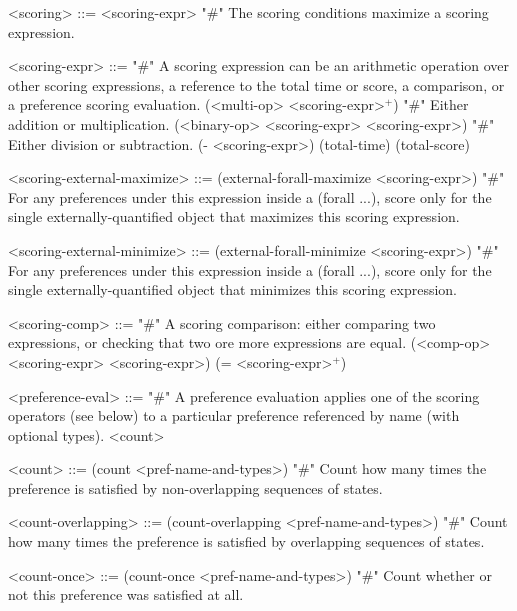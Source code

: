 \documentclass{article}
\begin{document}
\begin{grammar}
<scoring> ::= <scoring-expr> "#" The scoring conditions maximize a scoring expression.

<scoring-expr> ::= "#" A scoring expression can be an arithmetic operation over other scoring expressions, a reference to the total time or score, a comparison, or a preference scoring evaluation.
        \alt (<multi-op> <scoring-expr>$^+$) "#" Either addition or multiplication.
        \alt (<binary-op> <scoring-expr> <scoring-expr>) "#" Either division or subtraction.
        \alt (- <scoring-expr>)
        \alt (total-time)
        \alt (total-score)



<scoring-external-maximize> ::= (external-forall-maximize <scoring-expr>) "#" For any preferences under this expression inside a (forall ...), score only for the single externally-quantified object that maximizes this scoring expression.


<scoring-external-minimize> ::= (external-forall-minimize <scoring-expr>) "#" For any preferences under this expression inside a (forall ...), score only for the single externally-quantified object that minimizes this scoring expression.


<scoring-comp> ::=  "#" A scoring comparison: either comparing two expressions, or checking that two ore more expressions are equal.
        \alt (<comp-op> <scoring-expr> <scoring-expr>)
        \alt (= <scoring-expr>$^+$)


<preference-eval> ::= "#" A preference evaluation applies one of the scoring operators (see below) to a particular preference referenced by name (with optional types).
        \alt <count>



<count> ::= (count <pref-name-and-types>) "#" Count how many times the preference is satisfied by non-overlapping sequences of states.

<count-overlapping> ::= (count-overlapping <pref-name-and-types>) "#" Count how many times the preference is satisfied by overlapping sequences of states.

<count-once> ::= (count-once <pref-name-and-types>) "#" Count whether or not this preference was satisfied at all.


\end{grammar}
\end{document}
